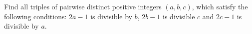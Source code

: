 Find all triples of pairwise distinct positive integers $(a,b,c)$, which satisfy the following conditions: $2a-1$ is divisible by $b$, $2b-1$ is divisible $c$ and $2c-1$ is divisible by $a$.
